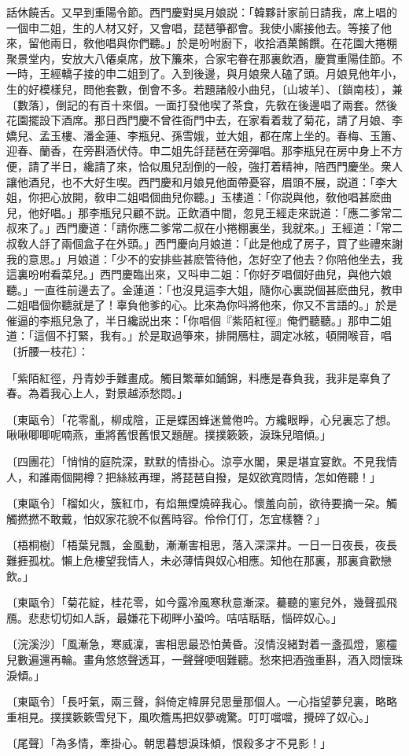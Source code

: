 話休饒舌。又早到重陽令節。西門慶對吳月娘説：「韓夥計家前日請我，席上唱的一個申二姐，生的人材又好，又會唱，琵琶箏都會。我使小廝接他去。等接了他來，留他兩日，敎他唱與你們聽。」於是吩咐廚下，收拾酒菓餚饌。在花園大捲棚聚景堂内，安放大八僊桌席，放下簾來，合家宅眷在那裏飲酒，慶賞重陽佳節。不一時，王經轎子接的申二姐到了。入到後邊，與月娘衆人磕了頭。月娘見他年小，生的好模樣兒，問他套數，倒會不多。若題諸般小曲兒，〔山坡羊〕、〔鎖南枝〕，兼〔數落〕，倒記的有百十來個。一面打發他喫了茶食，先敎在後邊唱了兩套。然後花園擺設下酒席。那日西門慶不曾徃衙門中去，在家看着栽了菊花，請了月娘、李嬌兒、孟玉樓、潘金蓮、李瓶兒、孫雪娥，並大姐，都在席上坐的。春梅、玉簫、迎春、蘭香，在旁斟酒伏侍。申二姐先㧱琵琶在旁彈唱。那李瓶兒在房中身上不方便，請了半日，纔請了來，恰似風兒刮倒的一般，強打着精神，陪西門慶坐。衆人讓他酒兒，也不大好生喫。西門慶和月娘見他面帶憂容，眉頭不展，説道：「李大姐，你把心放開，敎申二姐唱個曲兒你聽。」玉樓道：「你説與他，敎他唱甚麽曲兒，他好唱。」那李瓶兒只顧不説。正飲酒中間，忽見王經走來説道：「應二爹常二叔來了。」西門慶道：「請你應二爹常二叔在小捲棚裏坐，我就來。」王經道：「常二叔敎人㧱了兩個盒子在外頭。」西門慶向月娘道：「此是他成了房子，買了些禮來謝我的意思。」月娘道：「少不的安排些甚麽管待他，怎好空了他去？你陪他坐去，我這裏吩咐看菜兒。」西門慶臨出來，又呌申二姐：「你好歹唱個好曲兒，與他六娘聽。」一直徃前邊去了。金蓮道：「也沒見這李大姐，隨你心裏説個甚麽曲兒，教申二姐唱個你聽就是了！辜負他爹的心。比來為你呌將他來，你又不言語的。」於是催逼的李瓶兒急了，半日纔説出來：「你唱個『紫陌紅徑』俺們聽聽。」那申二姐道：「這個不打緊，我有。」於是取過箏來，排開鴈柱，調定冰絃，頓開喉音，唱〔折腰一枝花〕：

\begin{myquote}
「紫陌紅徑，丹青妙手難畫成。觸目繁華如鋪錦，料應是春負我，我非是辜負了春。為着我心上人，對景越添愁悶。」

{\markfont〔東甌令〕}「花零亂，柳成陰，正是蝶困蜂迷鶯倦吟。方纔眼睜，心兒裏忘了想。啾啾唧唧呢喃燕，重將舊恨舊恨又題醒。撲撲簌簌，淚珠兒暗傾。」

{\markfont〔四團花〕}「悄悄的庭院深，默默的情掛心。涼亭水閣，果是堪宜宴飲。不見我情人，和誰兩個開樽？把絲絃再理，將琵琶自撥，是奴欲寬悶情，怎如倦聽！」

{\markfont〔東甌令〕}「榴如火，簇紅巾，有焰無煙燒碎我心。懷羞向前，欲待要摘一朶。觸觸撚撚不敢戴，怕奴家花貌不似舊時容。伶伶仃仃，怎宜樣簪？」

{\markfont〔梧桐樹〕}「梧葉兒飄，金風動，漸漸害相思，落入深深井。一日一日夜長，夜長難捱孤枕。懶上危樓望我情人，未必薄情與奴心相應。知他在那裏，那裏貪歡戀飲。」

{\markfont〔東甌令〕}「菊花綻，桂花零，如今露冷風寒秋意漸深。驀聽的窻兒外，幾聲孤飛鴈。悲悲切切如人訴，最嫌花下砌畔小蛩吟。咭咭聒聒，惱碎奴心。」

{\markfont〔浣溪沙〕}「風漸急，寒威澟，害相思最恐怕黄昏。沒情沒緒對着一盞孤燈，窻欞兒數遍還再輪。畫角悠悠聲透耳，一聲聲哽咽難聽。愁來把酒強重斟，酒入悶懷珠淚傾。」

{\markfont〔東甌令〕}「長吁氣，兩三聲，斜倚定幃屏兒思量那個人。一心指望夢兒裏，略略重相見。撲撲簌簌雪兒下，風吹簷馬把奴夢魂驚。叮叮噹噹，攪碎了奴心。」

{\markfont〔尾聲〕}「為多情，牽掛心。朝思暮想淚珠傾，恨殺多才不見影！」
\end{myquote}


